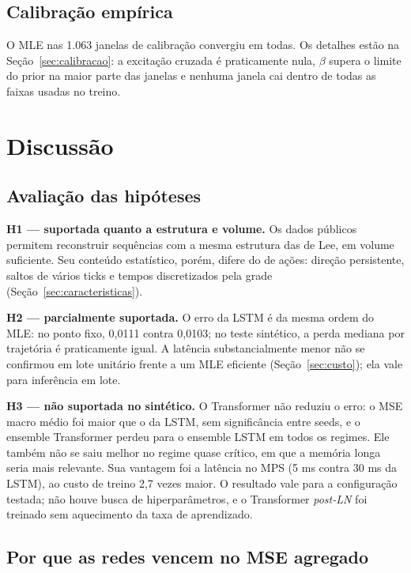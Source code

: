\documentclass[12pt,a4paper,openany]{report}
\begin{document}
\section{Calibração empírica}

O MLE nas 1.063 janelas de calibração convergiu em todas. Os detalhes estão na
Seção~\ref{sec:calibracao}: a excitação cruzada é praticamente nula, \(\beta\) supera o
limite do prior na maior parte das janelas e nenhuma janela cai dentro de todas as
faixas usadas no treino.

\chapter{Discussão}

\section{Avaliação das hipóteses}

\textbf{H1 --- suportada quanto a estrutura e volume.} Os dados públicos permitem
reconstruir sequências com a mesma estrutura das de Lee, em volume suficiente. Seu
conteúdo estatístico, porém, difere do de ações: direção persistente, saltos de vários
ticks e tempos discretizados pela grade (Seção~\ref{sec:caracteristicas}).

\textbf{H2 --- parcialmente suportada.} O erro da LSTM é da mesma ordem do MLE: no
ponto fixo, 0,0111 contra 0,0103; no teste sintético, a perda mediana por trajetória
é praticamente igual. A latência substancialmente menor não se confirmou em lote
unitário frente a um MLE eficiente (Seção~\ref{sec:custo}); ela vale para inferência
em lote.

\textbf{H3 --- não suportada no sintético.} O Transformer não reduziu o erro: o MSE
macro médio foi maior que o da LSTM, sem significância entre seeds, e o ensemble
Transformer perdeu para o ensemble LSTM em todos os regimes. Ele também não se saiu
melhor no regime quase crítico, em que a memória longa seria mais relevante. Sua
vantagem foi a latência no MPS (5 ms contra 30 ms da LSTM), ao custo de treino
2,7 vezes maior. O resultado vale para a configuração testada; não houve busca de
hiperparâmetros, e o Transformer \emph{post-LN} foi treinado sem aquecimento da taxa
de aprendizado.

\section{Por que as redes vencem no MSE agregado}
\end{document}
